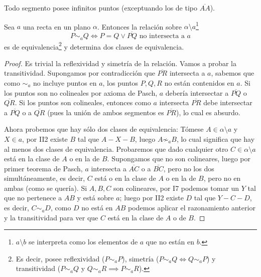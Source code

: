 \documentclass[11pt,a4paper]{book}
\begin{document}
\begin{cor}
Todo segmento posee infinitos puntos (exceptuando los de tipo $\overline{AA}$).
\end{cor}
\begin{thm}
Sea $a$ una recta en un plano $\alpha$. Entonces la relación sobre $\alpha\setminus a$\footnote{$a\setminus b$ se interpreta como los elementos de $a$ que no están en $b$.}
$$P\sim_a Q\iff P=Q\vee\overline{PQ}\text{ no intersecta a }a$$
es de equivalencia\footnote{Es decir, posee reflexividad ($P\sim_a P$), simetría ($P\sim_a Q\iff Q\sim_a P$) y transitividad ($P\sim_a Q$ y $Q\sim_a R\implies P\sim_a R$).}
y determina dos clases de equivalencia.
\end{thm}
\begin{proof}
Es trivial la reflexividad y simetría de la relación. Vamos a probar la transitividad. Supongamos por contradicción que $\overline{PR}$ intersecta a $a$, sabemos que como $\sim_a$ no incluye puntos en $a$, los puntos $P,Q,R$ no están contenidos en $a$. Si los puntos son no colineales por axioma de Pasch, $a$ debería intersectar a $\overline{PQ}$ o $\overline{QR}$. Si los puntos son colineales, entonces como $a$ intersecta $\overline{PR}$ debe intersectar a $\overline{PQ}$ o a $\overline{QR}$ (pues la unión de ambos segmentos es $\overline{PR}$), lo cual es absurdo.

Ahora probemos que hay sólo dos clases de equivalencia: Tómese $A\in\alpha\setminus a$ y $X\in a$, por II2 existe $B$ tal que $A-X-B$, luego $A\not\sim_a B$, lo cual significa que hay al menos dos clases de equivalencia. Probaremos que dado cualquier otro $C\in\alpha\setminus a$ está en la clase de $A$ o en la de $B$. Supongamos que no son colineares, luego por primer teorema de Pasch, $a$ intersecta a $\overline{AC}$ o a $\overline{BC}$, pero no los dos simultáneamente, es decir, $C$ está o en la clase de $A$ o en la de $B$, pero no en ambas (como se quería). Si $A,B,C$ son colineares, por I7 podemos tomar un $Y$ tal que no pertenece a $AB$ y está sobre $a$; luego por II2 existe $D$ tal que $Y-C-D$, es decir, $C\sim_a D$, como $D$ no está en $AB$ podemos aplicar el razonamiento anterior y la transitividad para ver que $C$ está en la clase de $A$ o de $B$.
\end{proof}
\end{document}
